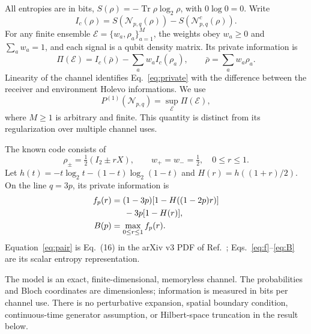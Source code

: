 \documentclass[aps,pra,reprint,amsmath,amssymb,longbibliography,nofootinbib]{revtex4-2}
\newcommand{\Tr}{\operatorname{Tr}}
\newcommand{\cN}{\mathcal N}
\newcommand{\cE}{\mathcal E}
\begin{document}
All entropies are in bits, $S(\rho)=-\Tr\rho\log_2\rho$, with $0\log 0=0$. Write
\begin{equation}
 I_c(\rho)=S(\cN_{p,q}(\rho))-S(\cN^c_{p,q}(\rho)).
 \label{eq:ic}
\end{equation}
For any finite ensemble $\cE=\{w_a,\rho_a\}_{a=1}^M$, the weights obey $w_a\ge0$ and $\sum_aw_a=1$, and each signal is a qubit density matrix. Its private information is
\begin{equation}
 \Pi(\cE)=I_c(\bar\rho)-\sum_aw_a I_c(\rho_a),
 \qquad \bar\rho=\sum_aw_a\rho_a.
 \label{eq:private}
\end{equation}
Linearity of the channel identifies Eq.~\eqref{eq:private} with the difference between the receiver and environment Holevo informations. We use
\begin{equation}
 P^{(1)}(\cN_{p,q})=\sup_{\cE}\Pi(\cE),
 \label{eq:P1}
\end{equation}
where $M\ge1$ is arbitrary and finite. This quantity is distinct from its regularization over multiple channel uses.

The known code consists of
\begin{equation}
 \rho_\pm=\tfrac12(I_2\pm rX),\qquad w_+=w_-=\tfrac12,
 \quad 0\le r\le1.
 \label{eq:pair}
\end{equation}
Let $h(t)=-t\log_2t-(1-t)\log_2(1-t)$ and $H(r)=h((1+r)/2)$. On the line $q=3p$, its private information is
\begin{align}
 f_p(r)&=(1-3p)[1-H((1-2p)r)]\nonumber\\
       &\hspace{1.5em}-3p[1-H(r)],\label{eq:f}\\
 B(p)&=\max_{0\le r\le1}f_p(r).\label{eq:B}
\end{align}
Equation~\eqref{eq:pair} is Eq.~(16) in the arXiv v3 PDF of Ref.~\cite{LLS2018}; Eqs.~\eqref{eq:f}--\eqref{eq:B} are its scalar entropy representation.

The model is an exact, finite-dimensional, memoryless channel. The probabilities and Bloch coordinates are dimensionless; information is measured in bits per channel use. There is no perturbative expansion, spatial boundary condition, continuous-time generator assumption, or Hilbert-space truncation in the result below.
\end{document}

